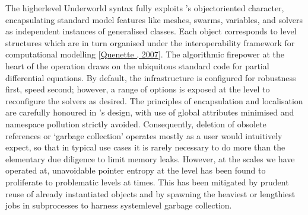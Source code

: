\documentclass[letterpaper,10pt,english]{jupyterBook}
\begin{document}
\sphinxAtStartPar
The higher\sphinxhyphen{}level Underworld syntax fully exploits ’s object\sphinxhyphen{}oriented character, encapsulating standard model features like meshes, swarms, variables, and solvers as independent instances of generalised classes. Each object corresponds to \sphinxhyphen{}level structures which are in turn organised under the  interoperability framework for computational modelling {[}\hyperlink{cite.references:id677}{Quenette , 2007}{]}. The algorithmic firepower at the heart of the operation draws on the ubiquitous standard  code for partial differential equations. By default, the  infrastructure is configured for robustness first, speed second; however, a range of options is exposed at the  level to reconfigure the solvers as desired. The principles of encapsulation and localisation are carefully honoured in ’s design, with use of global attributes minimised and namespace pollution strictly avoided. Consequently, deletion of obsolete references or ‘garbage collection’ operates mostly as a  user would intuitively expect, so that in typical use cases it is rarely necessary to do more than the elementary due diligence to limit memory leaks. However, at the scales we have operated at, unavoidable pointer entropy at the \sphinxhyphen{}level has been found to proliferate to problematic levels at times. This has been mitigated by prudent reuse of already instantiated objects and by spawning the heaviest or lengthiest jobs in subprocesses to harness system\sphinxhyphen{}level garbage collection.
\end{document}
